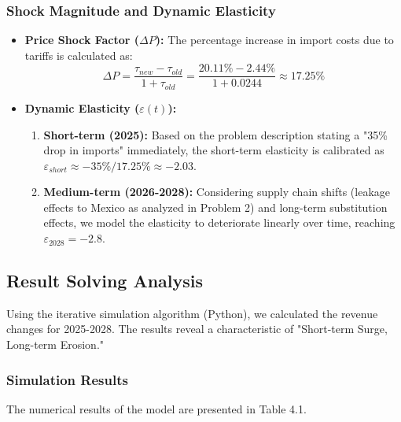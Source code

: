 \documentclass{apmcmthesis}
\begin{document}
\subsubsection{Shock Magnitude and Dynamic Elasticity}
\begin{itemize}
    \item \textbf{Price Shock Factor ($\Delta P$):} The percentage increase in import costs due to tariffs is calculated as:
    \begin{equation}
        \Delta P = \frac{\tau_{new} - \tau_{old}}{1 + \tau_{old}} = \frac{20.11\% - 2.44\%}{1 + 0.0244} \approx 17.25\%
    \end{equation}
    
    \item \textbf{Dynamic Elasticity ($\varepsilon(t)$):} 
    \begin{enumerate}
        \item \textbf{Short-term (2025):} Based on the problem description stating a "35\% drop in imports" immediately, the short-term elasticity is calibrated as $\varepsilon_{short} \approx -35\% / 17.25\% \approx -2.03$.
        \item \textbf{Medium-term (2026-2028):} Considering supply chain shifts (leakage effects to Mexico as analyzed in Problem 2) and long-term substitution effects, we model the elasticity to deteriorate linearly over time, reaching $\varepsilon_{2028} = -2.8$.
    \end{enumerate}
\end{itemize}

\subsection{Result Solving Analysis}
Using the iterative simulation algorithm (Python), we calculated the revenue changes for 2025-2028. The results reveal a characteristic of "Short-term Surge, Long-term Erosion."

\subsubsection{Simulation Results}
The numerical results of the model are presented in Table 4.1.
\end{document}
